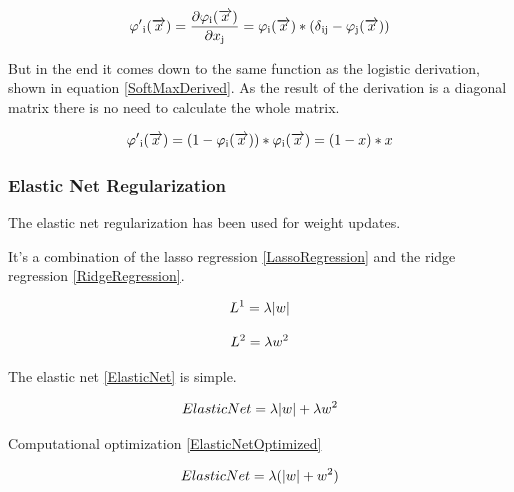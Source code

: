 \documentclass[11pt]{article}
\begin{document}
\begin{equation}
\label{SoftMaxWithDelta}
\varphi'\textsubscript{i}(\overrightarrow{x}) = \frac{\partial\varphi\textsubscript{i}(\overrightarrow{x})}{\partial x\textsubscript{j}} = \varphi\textsubscript{i}(\overrightarrow{x}) * (\delta\textsubscript{ij} - \varphi\textsubscript{j}(\overrightarrow{x}))
\end{equation}

But in the end it comes down to the same function as the logistic derivation, shown in equation \eqref{SoftMaxDerived}. As the result of the derivation is a diagonal matrix\cite{NIPS1993_877} there is no need to calculate the whole matrix.

\begin{equation}
\label{SoftMaxDerived}
\varphi'\textsubscript{i}(\overrightarrow{x}) = (1 - \varphi\textsubscript{i}(\overrightarrow{x})) * \varphi\textsubscript{i}(\overrightarrow{x}) = (1 - x) * x
\end{equation}

\subsubsection{Elastic Net Regularization}
The elastic net regularization\cite{zou2005regularization} has been used for weight updates.

It's a combination of the lasso regression \eqref{LassoRegression} and the ridge regression \eqref{RidgeRegression}.

\begin{equation}
\label{LassoRegression}
L\textsuperscript{1} = \lambda|w|
\end{equation}

\begin{equation}
\label{RidgeRegression}
L\textsuperscript{2} = \lambda w\textsuperscript{2}
\end{equation}

The elastic net \eqref{ElasticNet} is simple.

\begin{equation}
\label{ElasticNet}
ElasticNet = \lambda|w| + \lambda w\textsuperscript{2}
\end{equation}

Computational optimization \eqref{ElasticNetOptimized}

\begin{equation}
\label{ElasticNetOptimized}
ElasticNet = \lambda (|w| + w\textsuperscript{2})
\end{equation}
\end{document}
